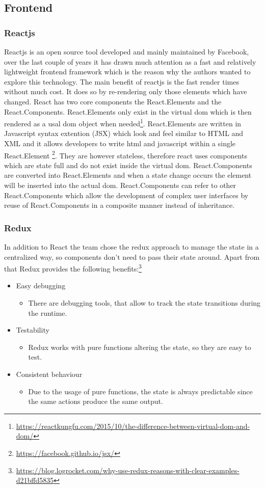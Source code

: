 \subsection{Frontend}
\subsubsection{Reactjs}
Reactjs is an open source tool developed and mainly maintained by Facebook, over the last couple of years it has drawn much attention as a fast and relatively lightweight frontend framework which is the reason why the authors wanted to explore this technology. The main benefit of reactjs  is the fast render times without much cost. It does so by re-rendering only those elements which have changed. React has two core components the React.Elements and the React.Components. React.Elements only exist in the virtual dom which is then rendered as a usal dom object when needed\footnote{\url{https://reactkungfu.com/2015/10/the-difference-between-virtual-dom-and-dom/}}. React.Elements are written in Javascript syntax extention (JSX) which look and feel similar to HTML and XML and it allows developers to write html and javascript within a single React.Element \footnote{\url{https://facebook.github.io/jsx/}}. They are however stateless, therefore react uses components which are state full and do not exist inside the virtual dom. React.Components are converted into React.Elements and when a state change occurs the element will be inserted into the actual dom. React.Components can refer to other React.Components which allow the development of complex user interfaces by reuse of React.Components in a composite manner instead of inheritance. 

\subsubsection{Redux}
In addition to React the team chose the redux approach to manage the state in a centralized way, so components don’t need to pass their state around. Apart from that Redux provides the following benefits:\footnote{\url{https://blog.logrocket.com/why-use-redux-reasons-with-clear-examples-d21bffd5835}}
\begin{itemize}
	\item Easy debugging
	\begin{itemize}
		\item There are debugging tools, that allow to track the state transitions during the runtime.
	\end{itemize}		
	\item Testability
	\begin{itemize}
		\item Redux works with pure functions altering the state, so they are easy to test.
	\end{itemize}
	\item Consistent behaviour
		\begin{itemize}
		\item Due to the usage of pure functions, the state is always predictable since the same actions produce the same output.
	\end{itemize}
\end{itemize}

